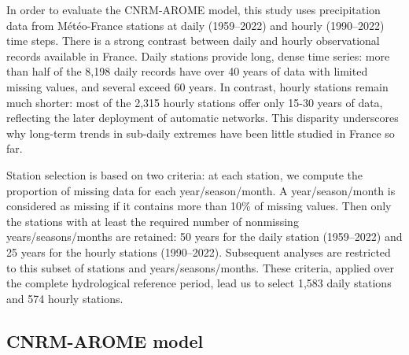\documentclass[hess, manuscript]{copernicus}
\begin{document}
In order to evaluate the CNRM-AROME model, this study uses precipitation data from Météo-France stations
\citep{meteofrance2024} at daily (1959--2022) and hourly (1990--2022) time
steps. There is a strong contrast between daily and hourly observational records available in France. Daily stations provide long, dense time series: more than half of the 8,198 daily records have over 40 years of data with limited missing values, and several exceed 60 years. In contrast, hourly stations remain much shorter: most of the 2,315 hourly stations offer only 15-30 years of data, reflecting the later deployment of automatic networks. This disparity underscores why long-term trends in sub-daily extremes have been little studied in France so far.  

Station selection is based on two criteria: at each station, we compute the proportion of missing data for each year/season/month. A year/season/month is considered as missing if it contains more than 10\% of missing values. Then only the stations with at least the required number of nonmissing years/seasons/months are retained: 50 years for the daily station (1959--2022) and 25 years for the hourly stations (1990--2022). Subsequent
analyses are restricted to this subset of stations and years/seasons/months. These criteria, applied over the complete hydrological reference period, lead us to select 1,583 daily stations and 574 hourly stations.

\subsection{CNRM-AROME model}\label{arome-model}

\end{document}
